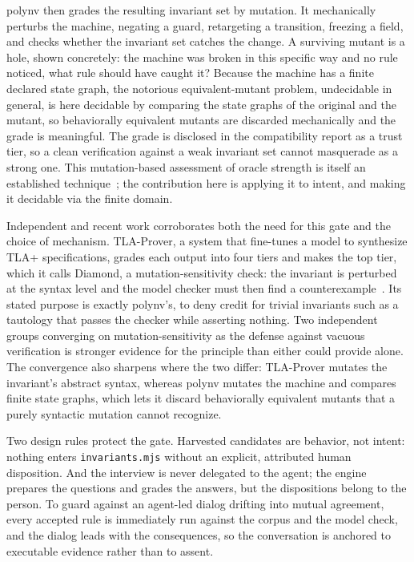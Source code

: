 \documentclass[11pt]{article}
\newcommand{\tool}[1]{\textsf{#1}}
\newcommand{\code}[1]{\texttt{#1}}
\begin{document}
\tool{polynv} then grades the resulting invariant set by mutation. It
mechanically perturbs the machine, negating a guard, retargeting a transition,
freezing a field, and checks whether the invariant set catches the change. A
surviving mutant is a hole, shown concretely: the machine was broken in this
specific way and no rule noticed, what rule should have caught it? Because the
machine has a finite declared state graph, the notorious equivalent-mutant
problem, undecidable in general, is here decidable by comparing the state
graphs of the original and the mutant, so behaviorally equivalent mutants are
discarded mechanically and the grade is meaningful. The grade is disclosed in
the compatibility report as a trust tier, so a clean verification against a
weak invariant set cannot masquerade as a strong one. This mutation-based
assessment of oracle strength is itself an established technique~\cite{oracle,
specfuzzer}; the contribution here is applying it to intent, and making it
decidable via the finite domain.

Independent and recent work corroborates both the need for this gate and the
choice of mechanism. TLA-Prover, a system that fine-tunes a model to synthesize
TLA+ specifications, grades each output into four tiers and makes the top tier,
which it calls Diamond, a mutation-sensitivity check: the invariant is perturbed
at the syntax level and the model checker must then find a
counterexample~\cite{tlaprover}. Its stated purpose is exactly \tool{polynv}'s,
to deny credit for trivial invariants such as a tautology that passes the checker
while asserting nothing. Two independent groups converging on
mutation-sensitivity as the defense against vacuous verification is stronger
evidence for the principle than either could provide alone. The convergence also
sharpens where the two differ: TLA-Prover mutates the invariant's abstract
syntax, whereas \tool{polynv} mutates the machine and compares finite state
graphs, which lets it discard behaviorally equivalent mutants that a purely
syntactic mutation cannot recognize.

Two design rules protect the gate. Harvested candidates are behavior, not
intent: nothing enters \code{invariants.mjs} without an explicit, attributed
human disposition. And the interview is never delegated to the agent; the
engine prepares the questions and grades the answers, but the dispositions
belong to the person. To guard against an agent-led dialog drifting into mutual
agreement, every accepted rule is immediately run against the corpus and the
model check, and the dialog leads with the consequences, so the conversation is
anchored to executable evidence rather than to assent.
\end{document}
